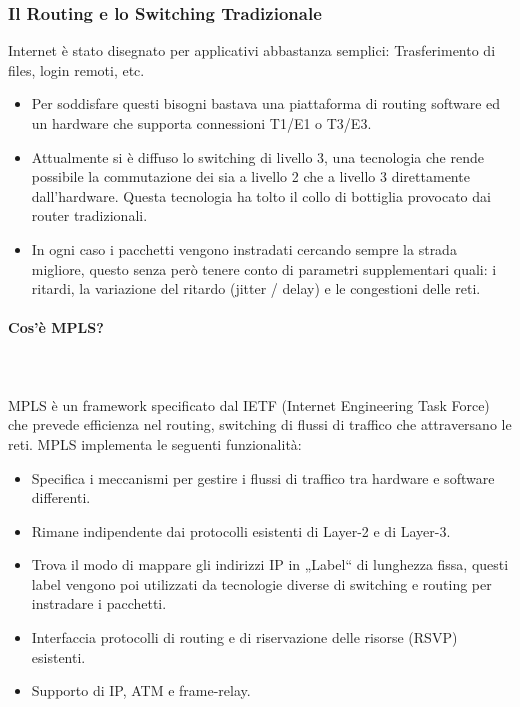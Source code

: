 \documentclass[8pt]{extarticle}
\begin{document}
\subsubsection{Il Routing e lo Switching Tradizionale}
Internet è stato disegnato per applicativi abbastanza semplici: Trasferimento di files, login remoti, etc.
\begin{itemize}
    \item Per soddisfare questi bisogni bastava una piattaforma di routing software ed un hardware 
    che supporta connessioni T1/E1 o T3/E3.
    \item Attualmente si è diffuso lo switching di livello 3, una tecnologia che rende possibile 
    la commutazione dei sia a livello 2 che a livello 3 direttamente dall’hardware. Questa tecnologia 
    ha tolto il collo di bottiglia provocato dai router tradizionali.
    \item In ogni caso i pacchetti vengono instradati cercando sempre la strada migliore, questo senza 
    però tenere conto di parametri supplementari quali: i ritardi, la variazione del ritardo 
    (jitter / delay) e le congestioni delle reti.
\end{itemize}
\paragraph{Cos’è MPLS?}
\noindent
\\\\
MPLS è un framework specificato dal IETF (Internet Engineering Task Force) che prevede efficienza 
nel routing, switching di flussi di traffico che attraversano le reti. MPLS implementa le seguenti funzionalità:
\begin{itemize}
    \item Specifica i meccanismi per gestire i flussi di traffico tra hardware e software differenti.
    \item Rimane indipendente dai protocolli esistenti di Layer-2 e di Layer-3.
    \item Trova il modo di mappare gli indirizzi IP in „Label“ di lunghezza fissa, questi label vengono poi utilizzati 
    da tecnologie diverse di switching e routing per instradare i pacchetti.
    \item Interfaccia protocolli di routing e di riservazione delle risorse (RSVP) esistenti.
    \item Supporto di IP, ATM e frame-relay.
\end{itemize}
\end{document}
